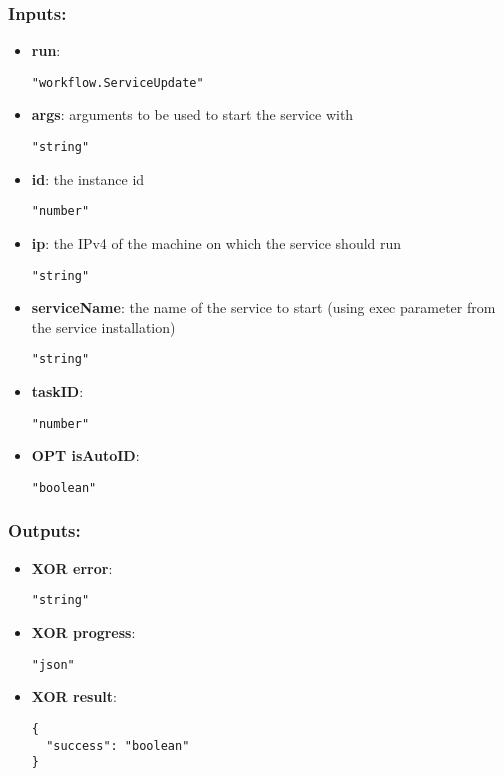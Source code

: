 \subsubsection*{Inputs:}
\begin{itemize}
    \item \textbf{run}: 
\begin{lstlisting}
"workflow.ServiceUpdate"
\end{lstlisting}
    \item \textbf{args}: arguments to be used to start the service with
\begin{lstlisting}
"string"
\end{lstlisting}
    \item \textbf{id}: the instance id
\begin{lstlisting}
"number"
\end{lstlisting}
    \item \textbf{ip}: the IPv4 of the machine on which the service should run
\begin{lstlisting}
"string"
\end{lstlisting}
    \item \textbf{serviceName}: the name of the service to start (using exec parameter from the service installation)
\begin{lstlisting}
"string"
\end{lstlisting}
    \item \textbf{taskID}: 
\begin{lstlisting}
"number"
\end{lstlisting}
    \item \textbf{OPT isAutoID}: 
\begin{lstlisting}
"boolean"
\end{lstlisting}
  \end{itemize}

\subsubsection*{Outputs:}
\begin{itemize}
    \item \textbf{XOR error}: 
\begin{lstlisting}
"string"
\end{lstlisting}
    \item \textbf{XOR progress}: 
\begin{lstlisting}
"json"
\end{lstlisting}
    \item \textbf{XOR result}: 
\begin{lstlisting}
{
  "success": "boolean"
}
\end{lstlisting}
  \end{itemize}

